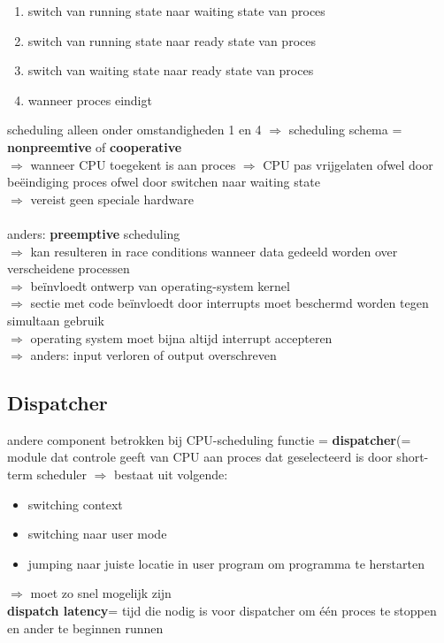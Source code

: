 \documentclass{report}
\begin{document}
\begin{enumerate}
\item switch van running state naar waiting state van proces
\item switch van running state naar ready state van proces
\item switch van waiting state naar ready state van proces
\item wanneer proces eindigt
\end{enumerate}

scheduling alleen onder omstandigheden 1 en 4 $\Rightarrow$ scheduling schema = \textbf{nonpreemtive} of \textbf{cooperative}
\\$\Rightarrow$ wanneer CPU toegekent is aan proces $\Rightarrow$ CPU pas vrijgelaten ofwel door be\"eindiging proces ofwel door switchen naar waiting state
\\$\Rightarrow$ vereist geen speciale hardware
\\
\\anders: \textbf{preemptive} scheduling
\\$\Rightarrow$ kan resulteren in race conditions wanneer data gedeeld worden over verscheidene processen
\\$\Rightarrow$ be\"invloedt ontwerp van operating-system kernel
\\$\Rightarrow$ sectie met code be\"invloedt door interrupts moet beschermd worden tegen simultaan gebruik
\\$\Rightarrow$ operating system moet bijna altijd interrupt accepteren
\\$\Rightarrow$ anders: input verloren of output overschreven

\subsection{Dispatcher}
andere component betrokken bij CPU-scheduling functie = \textbf{dispatcher}(= module dat controle geeft van CPU aan proces dat geselecteerd is door short-term scheduler
$\Rightarrow$ bestaat uit volgende:
\begin{itemize}
\item switching context
\item switching naar user mode
\item jumping naar juiste locatie in user program om programma te herstarten
\end{itemize}
$\Rightarrow$ moet zo snel mogelijk zijn
\\\textbf{dispatch latency}= tijd die nodig is voor dispatcher om \'e\'en proces te stoppen en ander te beginnen runnen
\end{document}
